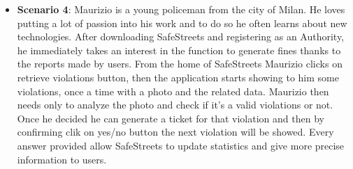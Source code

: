 \documentclass{article}
\begin{document}
\begin{itemize}
    \item \textbf{Scenario 4}:
    Maurizio is a young policeman from the city of Milan. He loves putting a lot of passion into his work and to do so he often learns about new 
    technologies. After downloading SafeStreets and registering as an Authority, he immediately takes an interest in the function to generate fines 
    thanks to the reports made by users. From the home of SafeStreets Maurizio clicks on retrieve violations button, then the application 
    starts showing to him some violations, once a time with a photo and the related data. Maurizio then needs only to analyze the photo and
    check if it's a valid violations or not. Once he decided he can generate a ticket for that violation and then by confirming clik on yes/no button
    the next violation will be showed. Every answer provided allow SafeStreets to update statistics and give more precise information to users. 
\end{itemize}
\end{document}

